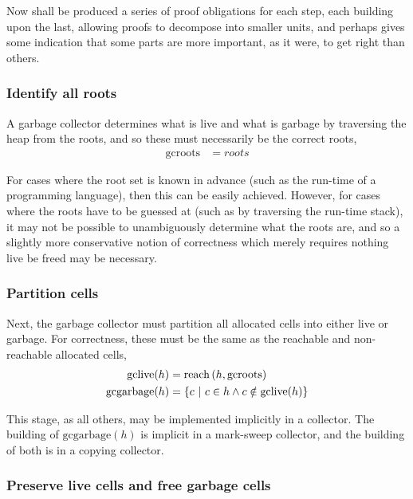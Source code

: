 Now shall be produced a series of proof obligations for each step,
each building upon the last, allowing proofs to decompose into smaller
units, and perhaps gives some indication that some parts are more
important, as it were, to get right than others.

\subsubsection{Identify all roots}
\label{sec:gc-framework-obligations-roots}

A garbage collector determines what is live and what is garbage by
traversing the heap from the roots, and so these must necessarily be
the correct roots,
\begin{align*}
  \mathrm{gcroots} &= roots
\end{align*}

For cases where the root set is known in advance (such as the run-time
of a programming language), then this can be easily achieved. However,
for cases where the roots have to be guessed at (such as by traversing
the run-time stack), it may not be possible to unambiguously determine
what the roots are, and so a slightly more conservative notion of
correctness which merely requires nothing live be freed may be
necessary.

\subsubsection{Partition cells}
\label{sec:gc-framework-obligations-partition}

Next, the garbage collector must partition all allocated cells into
either live or garbage. For correctness, these must be the same as the
reachable and non-reachable allocated cells,
\begin{align*}
  \mathrm{gclive}(h) &= \mathrm{reach}\left(h, \mathrm{gcroots}\right)\\
  \mathrm{gcgarbage}(h) &= \left\{c~|~c \in h \land c \notin
    \mathrm{gclive}(h)\right\}
\end{align*}

This stage, as all others, may be implemented implicitly in a
collector. The building of $\mathrm{gcgarbage}(h)$ is implicit in a
mark-sweep collector, and the building of both is in a copying
collector.

\subsubsection{Preserve live cells and free garbage cells}
\label{sec:gc-framework-obligations-collect}

